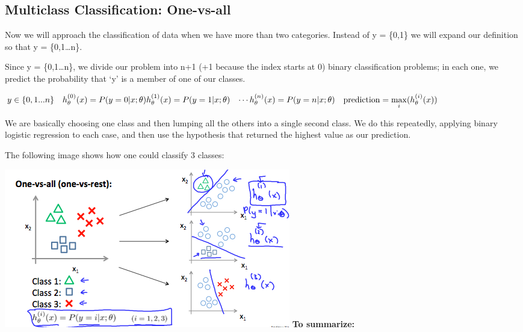 \documentclass[
]{article}
\begin{document}
\hypertarget{multiclass-classification-one-vs-all}{%
\subsection{Multiclass Classification:
One-vs-all}\label{multiclass-classification-one-vs-all}}

Now we will approach the classification of data when we have more than
two categories. Instead of y = \{0,1\} we will expand our definition so
that y = \{0,1\ldots n\}.

Since y = \{0,1\ldots n\}, we divide our problem into n+1 (+1 because
the index starts at 0) binary classification problems; in each one, we
predict the probability that `y' is a member of one of our classes.

\(\begin{align*}& y \in \lbrace0, 1 ... n\rbrace \newline& h_\theta^{(0)}(x) = P(y = 0 | x ; \theta) \newline& h_\theta^{(1)}(x) = P(y = 1 | x ; \theta) \newline& \cdots \newline& h_\theta^{(n)}(x) = P(y = n | x ; \theta) \newline& \mathrm{prediction} = \max_i( h_\theta ^{(i)}(x) )\newline\end{align*}\)

We are basically choosing one class and then lumping all the others into
a single second class. We do this repeatedly, applying binary logistic
regression to each case, and then use the hypothesis that returned the
highest value as our prediction.

The following image shows how one could classify 3 classes:

\includegraphics{multi_class_logreg.png} \textbf{To summarize:}
\end{document}
